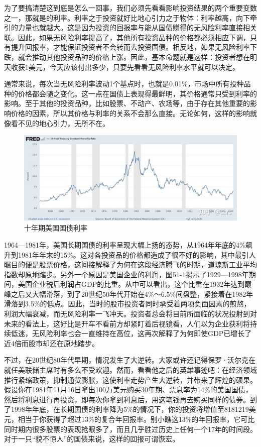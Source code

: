 \documentclass[UTF8,a4paper,zihao=-4,fontset = windows]{ctexart} %
\begin{document}
为了要搞清楚这到底是怎么一回事，我们必须先看看影响投资结果的两个重要变数之一，那就是的利率。利率之于投资就好比地心引力之于物体：利率越高，向下牵引的力量也就越大。这是因为投资的回报率与能从国债赚得的无风险利率直接相关联。因此，如果无风险利率提高了，其他所有投资品种的价格都必须相应下调，只有提升回报率，才能保证投资者不会转而去投资国债。相反地，如果无风险利率下跌，就会推动其他投资品种的价格上涨。因此，基本命题就是这样：投资者想在明天收获1美元，今天应该付出多少，只要先看看无风险利率水平就可以决定。

通常来说，每次当无风险利率波动1个基点时，也就是0.01\%，市场中所有投种品种的价格都会随之变化。这一点在国债上表现得最鲜明，其价格通常只受到利率的影响。至于其他的投资品种，比如股票、不动产、农场等，由于存在其他重要的影响价格的因素，所以其价格与利率的关系不会那么直接。无论如何，这样的影响就像看不见的地心引力，无所不在。
\begin{figure}[h!]
    \includegraphics[scale=0.3]{lilv.jpg}
    \caption{十年期美国国债利率}
    \label{lilv} 
    \end{figure}

1964—1981年，美国长期国债的利率呈现大幅上扬的态势，从1964年年底的4\%飙升到1981年年末的15\%。这对各投资品的价格都造成了很不好的影响，其中最引人瞩目的便是股票价格，这间接解释了为何在这段经济腾飞的时期，道琼斯工业平均指数却原地踏步。另外一个原因是美国企业的利润，图51-1揭示了1929—1998年期间，美国企业税后利润占GDP的比重。从中可以看出，这个比重在1932年达到巅峰之后又大幅滑落，到了20世纪50年代开始在4\%～6.5\%间盘整，紧接着在1982年滑落到3.5\%的低点。因此，当时的股市投资者同时承受着两项负面因素的煎熬，利润大幅衰减，而无风险利率一飞冲天。投资者总会将目前所面临的状况投射到对未来的看法上，这好比是开车不看前方却紧盯着后视镜看，人们以为企业获利将持续低迷，无风险利率也会一直维持在高位，这再次解释了为何即使GDP已增长了近4倍而股市却还在原地踏步。

不过，在20世纪80年代早期，情况发生了大逆转。大家或许还记得保罗·沃尔克在就任美联储主席时有多么不受欢迎。然而，看看他之后的英雄事迹吧：在经济领域推行紧缩政策，抑制通货膨胀，这使利率走势产生大逆转，并带来了辉煌的硕果。假设你在1981年11月16日拿出100万美元购买30年期、票息率为14\%的美国国债，然后将利息进行再投资，即每次你拿到利息后，用这笔钱再去购买同样的债券。到了1998年年底，在长期国债的利率降为5\%的情况下，你的投资将增值至8181219美元，相当于你获得了超过13\%的复合年回报率。别小瞧这13\%的年回报率，它可比同时期内很多股票的表现抢眼多了，而且几乎胜过历史上任何一个17年的时间段。对于一只“貌不惊人”的国债来说，这样的回报可谓恢宏。
\end{document}
